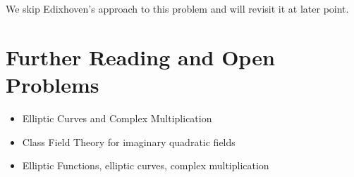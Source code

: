 We skip Edixhoven's approach to this problem and will
revisit it at later point.




\section{Further Reading and Open Problems}

\begin{itemize}
\item Elliptic Curves and Complex Multiplication \cite{Silverman:AEC,Silverman:Adv}
\item Class Field Theory for imaginary quadratic fields \cite{Cox}
\item Elliptic Functions, elliptic curves, complex multiplication \cite{Lang:elliptic}
\end{itemize}


